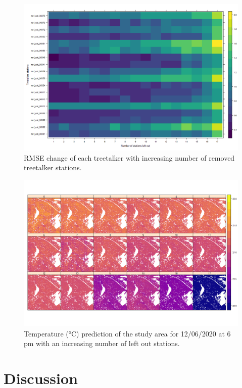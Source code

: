 \documentclass[5p]{elsarticle} %
\begin{document}
\begin{figure}[h]
\begin{center}
\includegraphics[scale=0.5]{heatmap_treetalker_rmse}
\caption{RMSE change of each treetalker with increasing number of removed treetalker stations.}
\end{center}
\end{figure}

\begin{figure}[t]
\begin{center}
\includegraphics[scale=0.5]{full_prediction_study_area}
\caption{Temperature (°C) prediction of the study area for 12/06/2020 at 6 pm with an increasing number of left out stations.}
\end{center}
\end{figure}

\hypertarget{discussion}{%
\section{Discussion}\label{discussion}}
\end{document}
